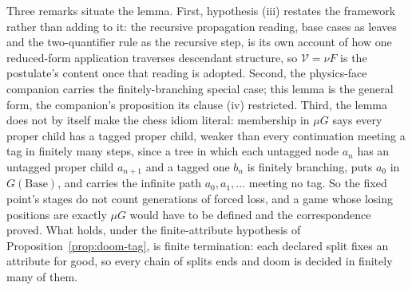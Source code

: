 Three remarks situate the lemma. First, hypothesis (iii) restates the framework rather than adding to it: the recursive propagation reading, base cases as leaves and the two-quantifier rule as the recursive step, is its own account of how one reduced-form application traverses descendant structure, so $\mathcal{V} = \nu F$ is the postulate's content once that reading is adopted. Second, the physics-face companion \cite{AethusQuant} carries the finitely-branching special case; this lemma is the general form, the companion's proposition its clause (iv) restricted. Third, the lemma does not by itself make the chess idiom literal: membership in $\mu G$ says every proper child has a tagged proper child, weaker than every continuation meeting a tag in finitely many steps, since a tree in which each untagged node $a_n$ has an untagged proper child $a_{n+1}$ and a tagged one $b_n$ is finitely branching, puts $a_0$ in $G(\mathrm{Base})$, and carries the infinite path $a_0, a_1, \ldots$ meeting no tag. So the fixed point's stages do not count generations of forced loss, and a game whose losing positions are exactly $\mu G$ would have to be defined and the correspondence proved. What holds, under the finite-attribute hypothesis of Proposition~\ref{prop:doom-tag}, is finite termination: each declared split fixes an attribute for good, so every chain of splits ends and doom is decided in finitely many of them.


